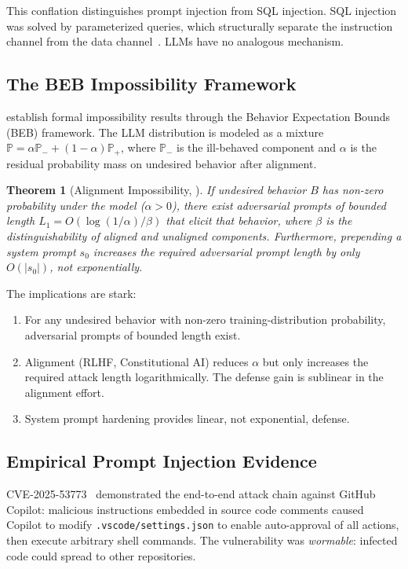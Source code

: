\documentclass[11pt, a4paper, copyright]{googledeepmind}
\newtheorem{theorem}{Theorem}[section]
\begin{document}
This conflation distinguishes prompt injection from SQL injection. SQL injection was solved by parameterized queries, which structurally separate the instruction channel from the data channel~\citep{ncsc2023prompt}. LLMs have no analogous mechanism.

\subsection{The BEB Impossibility Framework}

\citet{wolf2024fundamental} establish formal impossibility results through the Behavior Expectation Bounds (BEB) framework. The LLM distribution is modeled as a mixture $\mathbb{P} = \alpha \mathbb{P}_- + (1-\alpha)\mathbb{P}_+$, where $\mathbb{P}_-$ is the ill-behaved component and $\alpha$ is the residual probability mass on undesired behavior after alignment.

\begin{theorem}[Alignment Impossibility, \citealp{wolf2024fundamental}]
\label{thm:beb}
If undesired behavior $B$ has non-zero probability under the model ($\alpha > 0$), there exist adversarial prompts of bounded length $L_1 = O(\log(1/\alpha)/\beta)$ that elicit that behavior, where $\beta$ is the distinguishability of aligned and unaligned components. Furthermore, prepending a system prompt $s_0$ increases the required adversarial prompt length by only $O(|s_0|)$, not exponentially.
\end{theorem}

The implications are stark:
\begin{enumerate}
    \item For any undesired behavior with non-zero training-distribution probability, adversarial prompts of bounded length exist.
    \item Alignment (RLHF, Constitutional AI) reduces $\alpha$ but only increases the required attack length logarithmically. The defense gain is sublinear in the alignment effort.
    \item System prompt hardening provides linear, not exponential, defense.
\end{enumerate}

\subsection{Empirical Prompt Injection Evidence}

CVE-2025-53773~\citep{cve2025copilot} demonstrated the end-to-end attack chain against GitHub Copilot: malicious instructions embedded in source code comments caused Copilot to modify \texttt{.vscode/settings.json} to enable auto-approval of all actions, then execute arbitrary shell commands. The vulnerability was \emph{wormable}: infected code could spread to other repositories.
\end{document}
